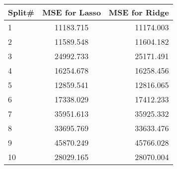 \documentclass{exam}
\begin{document}
\begin{questions}
\begin{center}
  \begin{tabular}{ l | c | r }
    \hline
     Split\# & MSE for Lasso & MSE for Ridge  \\
    \hline
     1 & 11183.715 & 11174.003 \\ \hline
     2 & 11589.548 & 11604.182 \\ \hline
     3 & 24992.733 & 25171.491 \\ \hline
     4 & 16254.678 & 16258.456 \\ \hline
     5 & 12859.541 & 12816.065 \\ \hline
     6 & 17338.029 & 17412.233 \\ \hline
     7 & 35951.613 & 35925.332 \\ \hline
     8 & 33695.769 & 33633.476 \\ \hline
     9 & 45870.249 & 45766.028 \\ \hline
   10 & 28029.165 & 28070.004 \\
    \hline
  \end{tabular}
\end{center}
 
\end{questions}
\end{document}
